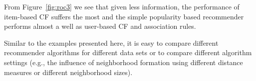 \documentclass[nojss]{jss}
\begin{document}
From Figure~\ref{fig:roc3} we see that given less information,
the performance of item-based CF suffers the most and the simple
popularity based recommender performs almost a well as user-based CF and
association rules.

Similar to the examples presented here, it is easy to compare different
recommender algorithms for different data sets or to compare
different algorithm settings (e.g.,
the influence of neighborhood formation using different distance measures or different neighborhood sizes).


%
%
%
%
%
%
%
%
%


\end{document}
